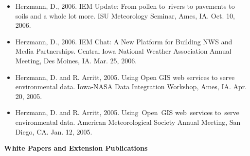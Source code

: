 \begin{itemize}
\item Herzmann, D., 2006. IEM Update: From pollen to rivers to pavements to soils and a whole lot more. ISU Meteorology Seminar, Ames, IA. Oct. 10, 2006.
\item Herzmann, D., 2006. IEM Chat: A New Platform for Building NWS and Media Partnerships. Central Iowa National Weather Association Annual Meeting, Des Moines, IA. Mar. 25, 2006.
\item Herzmann, D. and R. Arritt, 2005. Using Open GIS web services to serve environmental data. Iowa-NASA Data Integration Workshop, Ames, IA. Apr. 20, 2005.
\item Herzmann, D. and R. Arritt, 2005. Using Open GIS web services to serve environmental data. American Meteorological Society Annual Meeting, San Diego, CA. Jan. 12, 2005.
\end{itemize}
%
\normalsize \sf
\normalsize \bf White Papers and Extension Publications
\normalsize \sf
